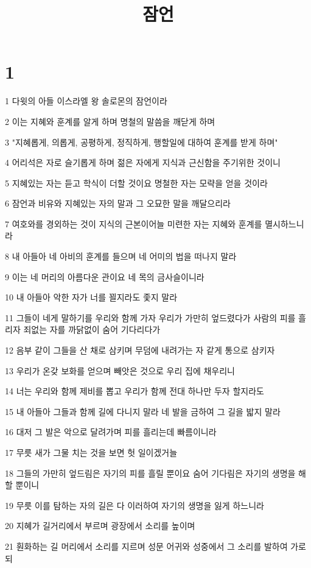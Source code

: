 

\title{잠언}


\chapter{1}

\par 1 다윗의 아들 이스라엘 왕 솔로몬의 잠언이라
\par 2 이는 지혜와 훈계를 알게 하며 명철의 말씀을 깨닫게 하며
\par 3 "지혜롭게, 의롭게, 공평하게, 정직하게, 행할일에 대하여 훈계를 받게 하며"
\par 4 어리석은 자로 슬기롭게 하며 젊은 자에게 지식과 근신함을 주기위한 것이니
\par 5 지혜있는 자는 듣고 학식이 더할 것이요 명철한 자는 모략을 얻을 것이라
\par 6 잠언과 비유와 지혜있는 자의 말과 그 오묘한 말을 깨달으리라
\par 7 여호와를 경외하는 것이 지식의 근본이어늘 미련한 자는 지혜와 훈계를 멸시하느니라
\par 8 내 아들아 네 아비의 훈계를 들으며 네 어미의 법을 떠나지 말라
\par 9 이는 네 머리의 아름다운 관이요 네 목의 금사슬이니라
\par 10 내 아들아 악한 자가 너를 꾈지라도 좇지 말라
\par 11 그들이 네게 말하기를 우리와 함께 가자 우리가 가만히 엎드렸다가 사람의 피를 흘리자 죄없는 자를 까닭없이 숨어 기다리다가
\par 12 음부 같이 그들을 산 채로 삼키며 무덤에 내려가는 자 같게 통으로 삼키자
\par 13 우리가 온갖 보화를 얻으며 빼앗은 것으로 우리 집에 채우리니
\par 14 너는 우리와 함께 제비를 뽑고 우리가 함께 전대 하나만 두자 할지라도
\par 15 내 아들아 그들과 함께 길에 다니지 말라 네 발을 금하여 그 길을 밟지 말라
\par 16 대저 그 발은 악으로 달려가며 피를 흘리는데 빠름이니라
\par 17 무릇 새가 그물 치는 것을 보면 헛 일이겠거늘
\par 18 그들의 가만히 엎드림은 자기의 피를 흘릴 뿐이요 숨어 기다림은 자기의 생명을 해할 뿐이니
\par 19 무릇 이를 탐하는 자의 길은 다 이러하여 자기의 생명을 잃게 하느니라
\par 20 지혜가 길거리에서 부르며 광장에서 소리를 높이며
\par 21 훤화하는 길 머리에서 소리를 지르며 성문 어귀와 성중에서 그 소리를 발하여 가로되
